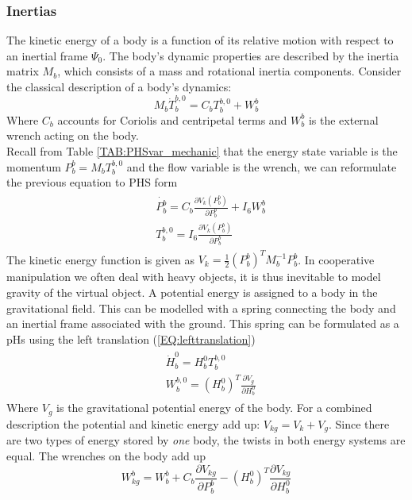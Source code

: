 \documentclass[a4paper,twoside, openright,12pt]{report}
\begin{document}
\subsubsection{Inertias}
The kinetic energy of a body is a function of its relative motion with respect to an inertial frame $ \Psi_0 $. The body's dynamic properties are described by the inertia matrix $M_b$, which consists of a mass and rotational inertia components. Consider the classical description of a body's dynamics:
\begin{equation}
	M_b \dot{T}_b^{b,0}  = C_b T_b^{b,0} + W_{b}^b
\end{equation}
Where $C_b$ accounts for Coriolis and centripetal terms and $W_{b}^b$ is the external wrench acting on the body.\\
Recall from Table \ref{TAB:PHSvar_mechanic} that the energy state variable is the momentum $P_b^b = M_b T_b^{b,0}$ and the flow variable is the wrench, we can reformulate the previous equation to PHS form
\begin{eqnarray}\label{EQ:PHSsimpleinertia}
\begin{aligned}
	&\dot{P_b^b} = C_b \frac{\partial V_k(P_b^b)}{\partial P_b^b} + I_6 W_{b}^b \\
	&T_b^{b,0} = I_6 \frac{\partial V_k(P_b^b)}{\partial P_b^b}
\end{aligned}
\end{eqnarray}
The kinetic energy function is given as $V_k = \frac{1}{2}(P_b^b)^T M_b^{-1} P_b^b$.
In cooperative manipulation we often deal with heavy objects, it is thus inevitable to model gravity of the virtual object. A potential energy is assigned to a body in the gravitational field. This can be modelled with a spring connecting the body and an inertial frame associated with the ground. This spring can be formulated as a pHs using the left translation (\ref{EQ:lefttranslation})
\begin{eqnarray}\label{EQ:gravityspring}
\begin{aligned}
	&\dot{H}_b^0 = H_b^0 T_b^{b,0}\\
	&W_b^{b,0} = (H_b^0)^T\frac{\partial V_{g}}{\partial H_b^0}
\end{aligned}
\end{eqnarray}
Where $V_g$ is the gravitational potential energy of the body. For a combined description the potential and kinetic energy add up: $V_{kg} = V_k + V_g$. Since there are two types of energy stored by \emph{one} body, the twists in both energy systems are equal. The wrenches on the body add up   
\[W_{kg}^b = W_{b}^b + C_b \frac{\partial V_{kg}}{\partial P_b^b} - (H_b^0)^T \frac{\partial V_{kg}}{\partial H_b^0} \]
\end{document}
